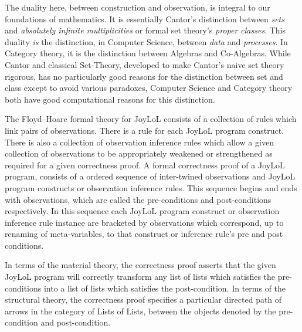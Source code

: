 \documentclass[a4paper,openany]{amsart}
\begin{document}
The duality here, between construction and observation, is integral to our
foundations of mathematics. It is essentially Cantor's distinction between
\emph{sets} and \emph{absolutely infinite multiplicities} or formal set theory's
\emph{proper classes}. This duality \emph{is} the distinction, in Computer
Science, between \emph{data} and \emph{processes}. In Category theory, it is the
distinction between Algebras and Co-Algebras. While Cantor and classical
Set-Theory, developed to make Cantor's naive set theory rigorous, has no
particularly good reasons for the distinction between set and class except to
avoid various paradoxes, Computer Science and Category theory both have good
computational reasons for this distinction. 

The Floyd–Hoare formal theory for JoyLoL consists of a collection of rules which
link pairs of observations. There is a rule for each JoyLoL program construct.
There is also a collection of observation inference rules which allow a given
collection of observations to be appropriately weakened or strengthened as
required for a given correctness proof. A formal correctness proof of a JoyLoL
program, consists of a ordered sequence of inter-twined observations and JoyLoL
program constructs or observation inference rules. This sequence begins and ends
with observations, which are called the pre-conditions and post-conditions
respectively. In this sequence each JoyLoL program construct or observation
inference rule instance are bracketed by observations which correspond, up to
renaming of meta-variables, to that construct or inference rule's pre and post
conditions.

In terms of the material theory, the correctness proof asserts that the given
JoyLoL program will correctly transform any list of lists which satisfies the
pre-conditions into a list of lists which satisfies the post-condition. In terms
of the structural theory, the correctness proof specifies a particular directed
path of arrows in the category of Lists of Lists, between the objects denoted by
the pre-condition and post-condition.
\end{document}
